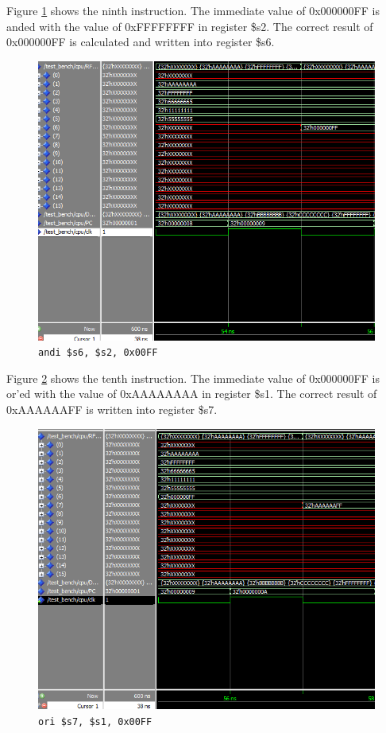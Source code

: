 \documentclass[12pt]{article}
\begin{document}
Figure \ref{fig:9-instr} shows the ninth instruction. The immediate value of 0x000000FF is anded with the value of 0xFFFFFFFF in register \$s2. The correct result of 0x000000FF is calculated and written into register \$s6.
\begin{figure}[h!]
\centering
\includegraphics[width=\linewidth]{simulation/9-instr}
\caption{\texttt{andi \$s6, \$s2, 0x00FF}}
\label{fig:9-instr}
\end{figure}
\clearpage

Figure \ref{fig:10-instr} shows the tenth instruction. The immediate value of 0x000000FF is or'ed with the value of 0xAAAAAAAA in register \$s1. The correct result of 0xAAAAAAFF is written into register \$s7.
\begin{figure}[h!]
\centering
\includegraphics[width=\linewidth]{simulation/10-instr}
\caption{\texttt{ori \$s7, \$s1, 0x00FF}}
\label{fig:10-instr}
\end{figure}
\clearpage
\end{document}
